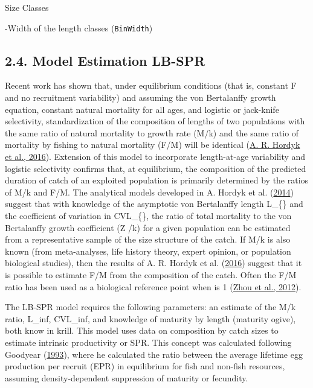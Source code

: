 \documentclass[
]{article}
\begin{document}
Size Classes

-Width of the length classes (\texttt{BinWidth})

\hypertarget{model-estimation-lb-spr}{%
\subsection{2.4. Model Estimation
LB-SPR}\label{model-estimation-lb-spr}}

Recent work has shown that, under equilibrium conditions (that is,
constant F and no recruitment variability) and assuming the von
Bertalanffy growth equation, constant natural mortality for all ages,
and logistic or jack-knife selectivity, standardization of the
composition of lengths of two populations with the same ratio of natural
mortality to growth rate (M/k) and the same ratio of mortality by
fishing to natural mortality (F/M) will be identical
(\protect\hyperlink{ref-Hordyk2016}{A. R. Hordyk et al., 2016}).
Extension of this model to incorporate length-at-age variability and
logistic selectivity confirms that, at equilibrium, the composition of
the predicted duration of catch of an exploited population is primarily
determined by the ratios of M/k and F/M. The analytical models developed
in A. Hordyk et al. (\protect\hyperlink{ref-Hordyk2014c}{2014}) suggest
that with knowledge of the asymptotic von Bertalanffy length
L\_\{\infty\} and the coefficient of variation in CVL\_\{\infty\}, the
ratio of total mortality to the von Bertalanffy growth coefficient (Z
/k) for a given population can be estimated from a representative sample
of the size structure of the catch. If M/k is also known (from
meta-analyses, life history theory, expert opinion, or population
biological studies), then the results of A. R. Hordyk et al.
(\protect\hyperlink{ref-Hordyk2016}{2016}) suggest that it is possible
to estimate F/M from the composition of the catch. Often the F/M ratio
has been used as a biological reference point when is 1
(\protect\hyperlink{ref-Zhou2012}{Zhou et al., 2012}).

The LB-SPR model requires the following parameters: an estimate of the
M/k ratio, L\_inf, CVL\_inf, and knowledge of maturity by length
(maturity ogive), both know in krill. This model uses data on
composition by catch sizes to estimate intrinsic productivity or SPR.
This concept was calculated following Goodyear
(\protect\hyperlink{ref-Goodyear1993}{1993}), where he calculated the
ratio between the average lifetime egg production per recruit (EPR) in
equilibrium for fish and non-fish resources, assuming density-dependent
suppression of maturity or fecundity.
\end{document}
